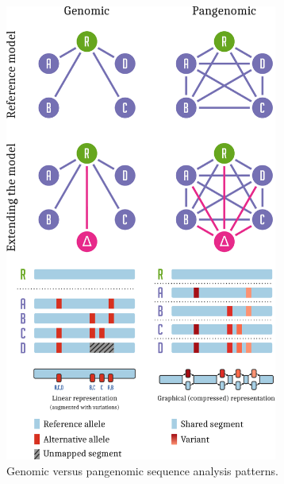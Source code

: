 \begin{figure}[p]
    \includegraphics[width=0.8\textwidth]{figures/gen_vs_pang.pdf}
    \caption{\label{fig:genvpan} Genomic versus pangenomic sequence analysis patterns.
    }
\end{figure}

